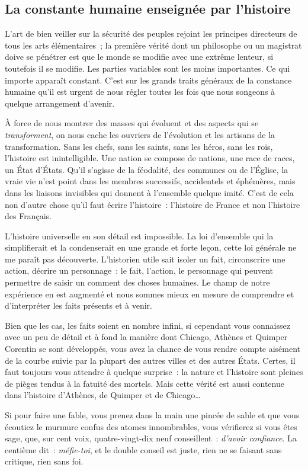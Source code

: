 \documentclass[french,twoside]{book} %
\newcommand{\astermono}{\medskip\centerline{\color{rubric}\large\selectfont{\syms ✻}}\medskip\par}%
\begin{document}
\astermono

\subsection[La constante humaine enseignée par l’histoire]{La constante humaine enseignée par l’histoire}
\noindent L’art de bien veiller sur la sécurité des peuples rejoint les principes directeurs de tous les arts élémentaires ; la première vérité dont un philosophe ou un magistrat doive se pénétrer est que le monde se modifie avec une extrême lenteur, si toutefois il se modifie. Les parties variables sont les moins importantes. Ce qui importe apparaît constant. C’est sur les grands traits généraux de la constance humaine qu’il est urgent de nous régler toutes les fois que nous songeons à quelque arrangement d’avenir.\par
À force de nous montrer des masses qui évoluent et des aspects qui se \emph{transforment}, on nous cache les ouvriers de l’évolution et les artisans de la transformation. Sans les chefs, sans les saints, sans les héros, sans les rois, l’histoire est inintelligible. Une nation se compose de nations, une race de races, un État d’États. Qu’il s’agisse de la féodalité, des communes ou de l’Église, la vraie vie n’est point dans les membres successifs, accidentels et éphémères, mais dans les liaisons invisibles qui donnent à l’ensemble quelque imité. C’est de cela non d’autre chose qu’il faut écrire l’histoire : l’histoire de France et non l’histoire des Français.\par
L’histoire universelle en son détail est impossible. La loi d’ensemble qui la simplifierait et la condenserait en une grande et forte leçon, cette loi générale ne me paraît pas découverte. L’historien utile sait isoler un fait, circonscrire une action, décrire un personnage : le fait, l’action, le personnage qui peuvent permettre de saisir un comment des choses humaines. Le champ de notre expérience en est augmenté et nous sommes mieux en mesure de comprendre et d’interpréter les faits présents et à venir.\par
Bien que les cas, les faits soient en nombre infini, si cependant vous connaissez avec un peu de détail et à fond la manière dont Chicago, Athènes et Quimper Corentin se sont développés, vous avez la chance de vous rendre compte aisément de la courbe suivie par la plupart des autres villes et des autres États. Certes, il faut toujours vous attendre à quelque surprise : la nature et l’histoire sont pleines de pièges tendus à la fatuité des mortels. Mais cette vérité est aussi contenue dans l’histoire d’Athènes, de Quimper et de Chicago…\par
Si pour faire une fable, vous prenez dans la main une pincée de sable et que vous écoutiez le murmure confus des atomes innombrables, vous vérifierez si vous êtes sage, que, sur cent voix, quatre-vingt-dix neuf conseillent : \emph{d’avoir confiance}. La centième dit : \emph{méfie-toi}, et le double conseil est juste, rien ne se faisant sans critique, rien sans foi.
\end{document}
